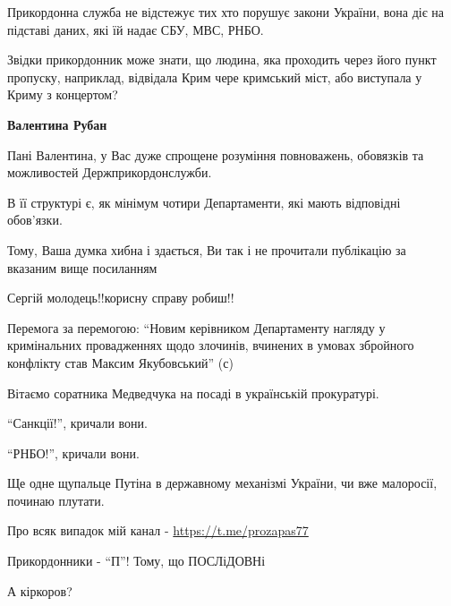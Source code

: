 \begin{itemize}
\begin{itemize}
Прикордонна служба не відстежує тих хто порушує закони України, вона діє на
підставі даних, які їй надає СБУ, МВС, РНБО.

Звідки прикордонник може знати, що людина, яка проходить через його пункт
пропуску, наприклад, відвідала Крим чере кримський міст, або виступала у Криму
з концертом?

\textbf{Валентина Рубан}

Пані Валентина, у Вас дуже спрощене розуміння повноважень, обовязків та
можливостей Держприкордонслужби.

В її структурі є, як мінімум чотири Департаменти, які мають відповідні
обов’язки.

Тому, Ваша думка хибна і здається, Ви так і не прочитали публікацію за вказаним
вище посиланням
\end{itemize}


Сергій молодець!!корисну справу робиш!!


Перемога за перемогою: \enquote{Новим керівником Департаменту нагляду у кримінальних
провадженнях щодо злочинів, вчинених в умовах збройного конфлікту став Максим
Якубовський} (с)

Вітаємо соратника Медведчука на посаді в українській прокуратурі.

\enquote{Санкції!}, кричали вони.

\enquote{РНБО!}, кричали вони.

Ще одне щупальце Путіна в державному механізмі України, чи вже малоросії,
починаю плутати.

Про всяк випадок мій канал - \url{https://t.me/prozapas77}

Прикордонники - \enquote{П}! Тому, що ПОСЛіДОВНі 🙂

А кіркоров?

\end{itemize}
